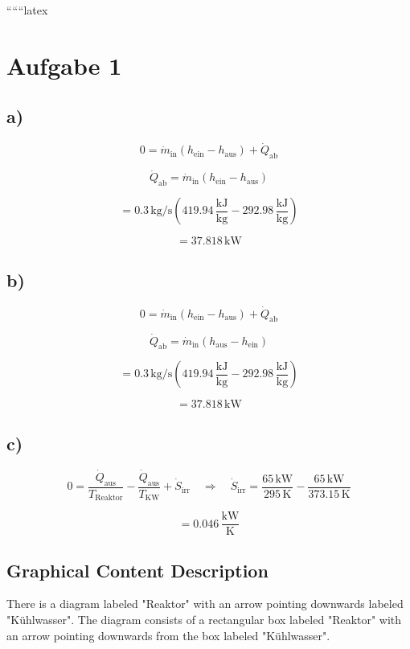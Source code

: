 ``````latex


\section*{Aufgabe 1}

\subsection*{a)}

\[
0 = \dot{m}_{\text{in}} (h_{\text{ein}} - h_{\text{aus}}) + \dot{Q}_{\text{ab}}
\]

\[
\dot{Q}_{\text{ab}} = \dot{m}_{\text{in}} (h_{\text{ein}} - h_{\text{aus}})
\]

\[
= 0.3 \, \text{kg/s} \left( 419.94 \, \frac{\text{kJ}}{\text{kg}} - 292.98 \, \frac{\text{kJ}}{\text{kg}} \right)
\]

\[
= 37.818 \, \text{kW}
\]

\subsection*{b)}

\[
0 = \dot{m}_{\text{in}} (h_{\text{ein}} - h_{\text{aus}}) + \dot{Q}_{\text{ab}}
\]

\[
\dot{Q}_{\text{ab}} = \dot{m}_{\text{in}} (h_{\text{aus}} - h_{\text{ein}})
\]

\[
= 0.3 \, \text{kg/s} \left( 419.94 \, \frac{\text{kJ}}{\text{kg}} - 292.98 \, \frac{\text{kJ}}{\text{kg}} \right)
\]

\[
= 37.818 \, \text{kW}
\]

\subsection*{c)}

\[
0 = \frac{\dot{Q}_{\text{aus}}}{T_{\text{Reaktor}}} - \frac{\dot{Q}_{\text{aus}}}{T_{\text{KW}}} + \dot{S}_{\text{irr}} \quad \Rightarrow \quad \dot{S}_{\text{irr}} = \frac{65 \, \text{kW}}{295 \, \text{K}} - \frac{65 \, \text{kW}}{373.15 \, \text{K}}
\]

\[
= 0.046 \, \frac{\text{kW}}{\text{K}}
\]

\subsection*{Graphical Content Description}

There is a diagram labeled "Reaktor" with an arrow pointing downwards labeled "Kühlwasser". The diagram consists of a rectangular box labeled "Reaktor" with an arrow pointing downwards from the box labeled "Kühlwasser".

